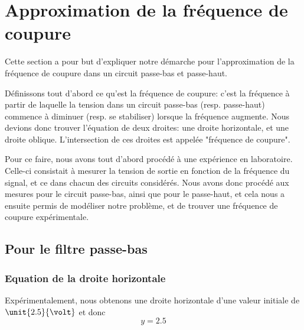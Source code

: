 

 
      
%
 



\section{Approximation de la fréquence de coupure}

Cette section a pour but d'expliquer notre démarche pour l'approximation de la fréquence de coupure dans un circuit passe-bas et passe-haut. 

Définissons tout d'abord ce qu'est la fréquence de coupure: c'est la fréquence à partir de laquelle la tension dans un circuit passe-bas (resp. passe-haut) commence à diminuer (resp. se stabiliser) lorsque la fréquence augmente.
Nous devions donc trouver l'équation de deux droites: une droite horizontale, et une droite oblique. L'intersection de ces droites est appelée "fréquence de coupure".

Pour ce faire, nous avons tout d'abord procédé à une expérience en laboratoire. 
Celle-ci consistait à mesurer la tension de sortie en fonction de la fréquence du signal, et ce dans chacun des circuits considérés. 
Nous avons donc procédé aux mesures pour le circuit passe-bas, ainsi que pour le passe-haut, et cela nous a ensuite permis de modéliser notre problème, et de trouver une fréquence de coupure expérimentale.

\subsection{Pour le filtre passe-bas}

%   

\subsubsection{Equation de la droite horizontale} %
Expérimentalement, nous obtenons une droite horizontale d'une valeur initiale de $\unit{2.5}{\volt}$ et donc \[y=2.5\]

